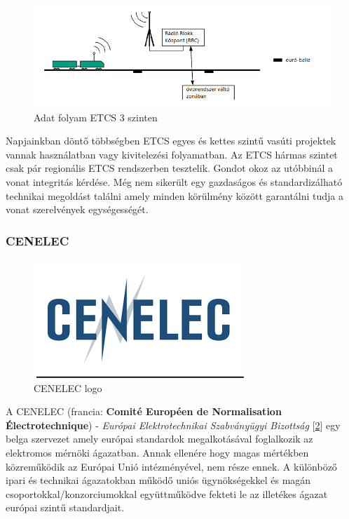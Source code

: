 \documentclass[a4paper,12pt]{article}
\begin{document}
\begin{itemize}
	\begin{figure}[htp]
	    \centering
	    \includegraphics[width=\linewidth]{images/etcs_level_3.png}
	    \caption[ETCS 3]{Adat folyam ETCS 3 szinten}
	    \label{fig:etcslevel3}
    \end{figure}	
\end{itemize}

Napjainkban döntő többségben ETCS egyes és kettes szintű vasúti projektek vannak használatban vagy kivitelezési folyamatban. 
Az ETCS hármas szintet csak pár regionális ETCS rendszerben tesztelik. Gondot okoz az utóbbinál a vonat integritás kérdése. 
Még nem sikerült egy gazdaságos és standardizálható technikai megoldást találni amely minden körülmény között garantálni tudja a vonat szerelvények egységességét. 

\subsubsection{CENELEC}\label{cenelecchapter}
    \begin{figure}
        \vspace{-20pt}
        \centering
        \includegraphics[scale=0.4]{images/CENELEC_logo.png}
        \caption[CENELEC logo]{CENELEC logo}
        \label{cenelec_logo}
    \end{figure}

A CENELEC (francia: \textbf{Comité Européen de Normalisation Électrotechnique}) - \textit{Európai Elektrotechnikai Szabványügyi Bizottság} [\ref{cenelec_logo}] egy belga szervezet amely európai standardok megalkotásával foglalkozik az elektromos mérnöki ágazatban. 
Annak ellenére hogy magas mértékben közreműködik az Európai Unió intézményével, nem része ennek.
A különböző ipari és technikai ágazatokban működő uniós ügynökségekkel és magán csoportokkal/konzorciumokkal együttműködve fekteti le az illetékes ágazat európai szintű standardjait.
\end{document}
